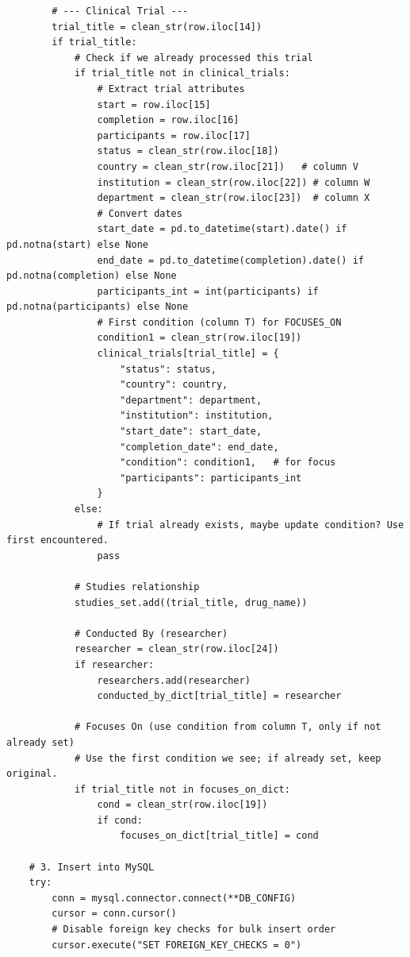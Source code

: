 \documentclass[15pt,a4paper]{article}
\begin{document}
\begin{lstlisting}
        # --- Clinical Trial ---
        trial_title = clean_str(row.iloc[14])
        if trial_title:
            # Check if we already processed this trial
            if trial_title not in clinical_trials:
                # Extract trial attributes
                start = row.iloc[15]
                completion = row.iloc[16]
                participants = row.iloc[17]
                status = clean_str(row.iloc[18])
                country = clean_str(row.iloc[21])   # column V
                institution = clean_str(row.iloc[22]) # column W
                department = clean_str(row.iloc[23])  # column X
                # Convert dates
                start_date = pd.to_datetime(start).date() if pd.notna(start) else None
                end_date = pd.to_datetime(completion).date() if pd.notna(completion) else None
                participants_int = int(participants) if pd.notna(participants) else None
                # First condition (column T) for FOCUSES_ON
                condition1 = clean_str(row.iloc[19])
                clinical_trials[trial_title] = {
                    "status": status,
                    "country": country,
                    "department": department,
                    "institution": institution,
                    "start_date": start_date,
                    "completion_date": end_date,
                    "condition": condition1,   # for focus
                    "participants": participants_int
                }
            else:
                # If trial already exists, maybe update condition? Use first encountered.
                pass

            # Studies relationship
            studies_set.add((trial_title, drug_name))

            # Conducted By (researcher)
            researcher = clean_str(row.iloc[24])
            if researcher:
                researchers.add(researcher)
                conducted_by_dict[trial_title] = researcher

            # Focuses On (use condition from column T, only if not already set)
            # Use the first condition we see; if already set, keep original.
            if trial_title not in focuses_on_dict:
                cond = clean_str(row.iloc[19])
                if cond:
                    focuses_on_dict[trial_title] = cond

    # 3. Insert into MySQL
    try:
        conn = mysql.connector.connect(**DB_CONFIG)
        cursor = conn.cursor()
        # Disable foreign key checks for bulk insert order
        cursor.execute("SET FOREIGN_KEY_CHECKS = 0")


\end{lstlisting}
\end{document}
